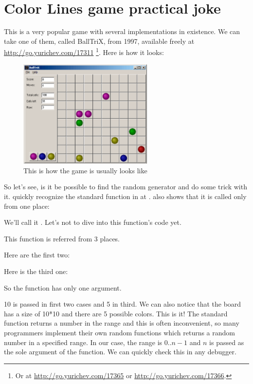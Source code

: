 ﻿\clearpage
\section{Color Lines game practical joke}
\label{chap:color_lines}

This is a very popular game with several implementations in existence.
We can take one of them, called BallTriX, from 1997, available freely at \url{http://go.yurichev.com/17311}
\footnote{Or at \url{http://go.yurichev.com/17365} or \url{http://go.yurichev.com/17366}.}.
Here is how it looks:%

\begin{figure}[H]
\centering
\includegraphics[width=0.6\textwidth]{examples/lines/1.png}
\caption{This is how the game is usually looks like}
\label{fig:lines_1}
\end{figure}

\clearpage
{}

So let's see, is it be possible to find the random generator and do some trick with it.
\IDA quickly recognize the standard  function in  at .
\IDA also shows that it is called only from one place:



We'll call it .
Let's not to dive into this function's code yet.

This function is referred from 3 places.

Here are the first two:



Here is the third one:



So the function has only one argument.

10 is passed in first two cases and 5 in third.
We can also notice 
that the board has a size of 10*10 and there are 5 possible colors.
This is it!
The standard  function returns 
a number in the  range and this is often inconvenient,
so many programmers implement their own random functions which returns a random number in a specified range.
In our case, the range is $0..n-1$ and $n$ is passed as the sole argument of the function.
We can quickly check this in any debugger.

